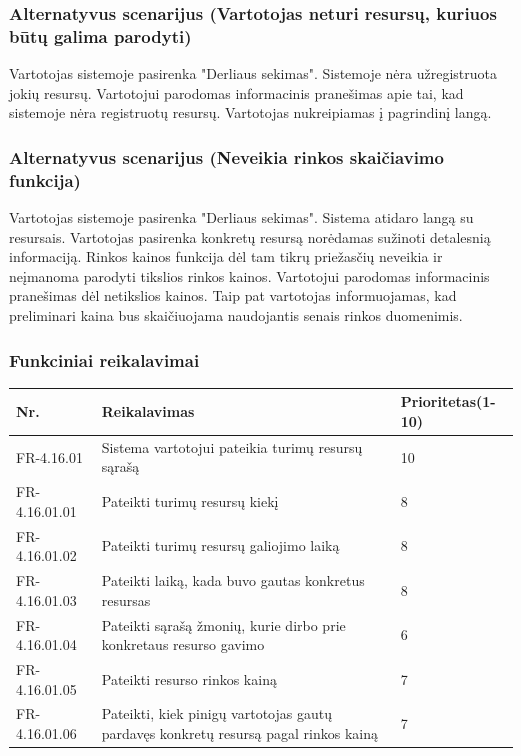 \documentclass[oneside]{VUMIFPSkursinis}
\begin{document}
	\subsubsection{Alternatyvus scenarijus (Vartotojas neturi resursų, kuriuos būtų galima parodyti)}
	Vartotojas sistemoje pasirenka "Derliaus sekimas". Sistemoje nėra užregistruota jokių resursų. Vartotojui parodomas informacinis pranešimas apie tai, kad sistemoje nėra registruotų resursų. Vartotojas nukreipiamas į pagrindinį langą.
	\subsubsection{Alternatyvus scenarijus (Neveikia rinkos skaičiavimo funkcija)}
	Vartotojas sistemoje pasirenka "Derliaus sekimas". Sistema atidaro langą su resursais. Vartotojas pasirenka konkretų resursą norėdamas sužinoti detalesnią informaciją. Rinkos kainos funkcija dėl tam tikrų priežasčių neveikia ir neįmanoma parodyti tikslios rinkos kainos. Vartotojui parodomas informacinis pranešimas dėl netikslios kainos. Taip pat vartotojas informuojamas, kad preliminari kaina bus skaičiuojama naudojantis senais rinkos duomenimis.
\pagebreak
	\subsubsection{Funkciniai reikalavimai}
\begin{table}[htbp]
	\begin{tabularx}{1\textwidth}{ |P{2.5cm}|X|P{3cm }| }  \hline
		Nr. & Reikalavimas & Prioritetas(1-10) \\ \hline
		FR-4.16.01 & Sistema vartotojui pateikia turimų resursų sąrašą & 10 \\ \hline
		FR-4.16.01.01 & Pateikti turimų resursų kiekį & 8 \\ \hline
		FR-4.16.01.02 & Pateikti turimų resursų galiojimo laiką & 8 \\ \hline
		FR-4.16.01.03 & Pateikti laiką, kada buvo gautas konkretus resursas & 8 \\ \hline
		FR-4.16.01.04 & Pateikti sąrašą žmonių, kurie dirbo prie konkretaus resurso gavimo & 6 \\ \hline
		FR-4.16.01.05 & Pateikti resurso rinkos kainą & 7 \\ \hline 
		FR-4.16.01.06 & Pateikti, kiek pinigų vartotojas gautų pardavęs konkretų resursą pagal rinkos kainą & 7 \\ \hline
	\end{tabularx}
\end{table}	
	
\end{document}
